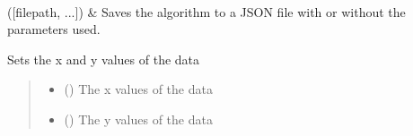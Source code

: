 \documentclass[letterpaper,10pt,english]{sphinxmanual}
\begin{document}
\begin{fulllineitems}
\begin{savenotes}
\begin{longtable}{}
\\
\sphinxhline
\sphinxAtStartPar
{\hyperref[\detokenize{source/_autosummary/HDF5_BLS_analyse.Analyse_backend:HDF5_BLS_analyse.Analyse_backend.silent_save_algorithm}]{}}({[}filepath, ...{]})
&
\sphinxAtStartPar
Saves the algorithm to a JSON file with or without the parameters used.
\\
\sphinxbottomrule
\end{longtable}
\sphinxtableafterendhook
\sphinxatlongtableend
\end{savenotes}

\begin{fulllineitems}
\label{\detokenize{source/_autosummary/HDF5_BLS_analyse.Analyse_backend:HDF5_BLS_analyse.Analyse_backend.set_x_y}}
\pysigstartsignatures
\pysiglinewithargsret
{}
{\sphinxparamcomma {}}
{}
\pysigstopsignatures
\sphinxAtStartPar
Sets the x and y values of the data
\begin{quote}\begin{description}
\begin{itemize}
\item {} 
\sphinxAtStartPar
{} () \textendash{} The x values of the data

\item {} 
\sphinxAtStartPar
{} () \textendash{} The y values of the data

\end{itemize}

\end{description}\end{quote}

\end{fulllineitems}



\end{fulllineitems}
\end{document}
